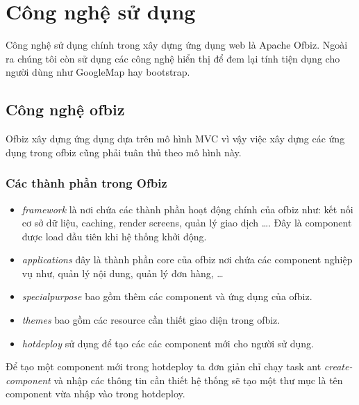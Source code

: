 \documentclass[a4paper,12pt]{report}
\begin{document}
\section{Công nghệ sử dụng}
Công nghệ sử dụng chính trong xây dựng ứng dụng web là Apache Ofbiz. Ngoài ra chúng tôi còn sử dụng các công nghệ hiển thị để đem lại tính tiện dụng cho người dùng như GoogleMap hay bootstrap.
\subsection{Công nghệ ofbiz}
Ofbiz xây dựng ứng dụng dựa trên mô hình MVC vì vậy việc xây dựng các ứng dụng trong ofbiz cũng phải tuân thủ theo mô hình này. 	
\subsubsection{Các thành phần trong Ofbiz}
\begin{itemize}
\item \textit{framework} là nơi chứa các thành phần hoạt động chính của ofbiz như: kết nối cơ sở dữ liệu, caching, render screens, quản lý giao dịch \ldots. Đây là component được load đầu tiên khi hệ thống khởi động.
\item \textit{applications} đây là thành phần core của ofbiz nơi chứa các component nghiệp vụ như, quản lý nội dung, quản lý đơn hàng, \ldots

\item \textit{specialpurpose} bao gồm thêm các component và ứng dụng của ofbiz.
\item \textit{themes} bao gồm các resource cần thiết giao diện trong ofbiz.
\item \textit{hotdeploy} sử dụng để tạo các các component mới cho người sử dụng.
\end{itemize}
Để tạo một component mới trong hotdeploy ta đơn giản chỉ chạy task ant \textit{create-component} và nhập các thông tin cần thiết hệ thống sẽ tạo một thư mục là tên component vừa nhập vào trong hotdeploy. \\
\end{document}
